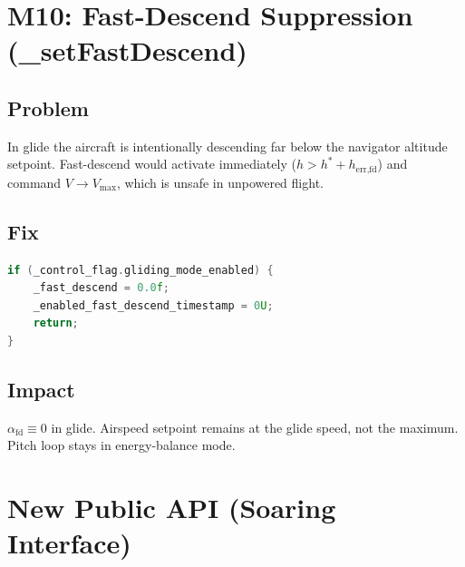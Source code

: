 \documentclass[12pt,a4paper]{article}
\begin{document}
\section{M10: Fast-Descend Suppression (\_setFastDescend)}

\subsection{Problem}

In glide the aircraft is intentionally descending far below the navigator
altitude setpoint. Fast-descend would activate immediately
($h > h^* + h_{\text{err,fd}}$) and command $V \to V_{\max}$, which is
unsafe in unpowered flight.

\subsection{Fix}

\begin{lstlisting}[language=C++]
if (_control_flag.gliding_mode_enabled) {
    _fast_descend = 0.0f;
    _enabled_fast_descend_timestamp = 0U;
    return;
}
\end{lstlisting}

\subsection{Impact}

$\alpha_{\text{fd}} \equiv 0$ in glide. Airspeed setpoint remains at the
glide speed, not the maximum. Pitch loop stays in energy-balance mode.

\section{New Public API (Soaring Interface)}
\end{document}
